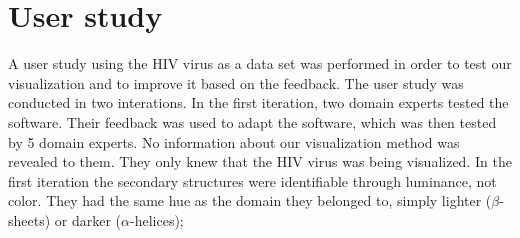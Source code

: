 \documentclass[review,journal]{vgtc}         %
\begin{document}
%
%

\section{User study}
A user study using the HIV virus as a data set was performed in order to test our visualization and to improve it based on the feedback.
The user study was conducted in two interations. 
In the first iteration, two domain experts tested the software. 
Their feedback was used to adapt the software, which was then tested by 5 domain experts.
No information about our visualization method was revealed to them. They only knew that the HIV virus was being visualized.
In the first iteration the secondary structures were identifiable through luminance, not color. They had the same hue as the domain they belonged to, simply lighter ($\beta$-sheets) or darker ($\alpha$-helices);
\end{document}
